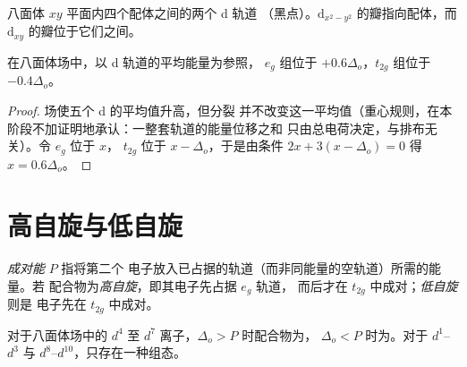 \begin{omfigure}

{\small 八面体 $xy$ 平面内四个配体之间的两个 d 轨道
（黑点）。$\mathrm d_{x^2-y^2}$ 的瓣指向配体，而
$\mathrm d_{xy}$ 的瓣位于它们之间。}
\end{omfigure}

\begin{theorem}[重心]\label{thm:b2:ligand-field:barycentre}
在八面体场中，以 d 轨道的平均能量为参照，
$e_g$ 组位于 $+0.6\Delta_o$，$t_{2g}$ 组位于 $-0.4\Delta_o$。
\end{theorem}

\begin{proof}
场使五个 d 的平均值升高，但分裂
并不改变这一平均值（重心规则，在本阶段不加证明地承认：一整套轨道的能量位移之和
只由总电荷决定，与排布无关）。令 $e_g$ 位于 $x$，
$t_{2g}$ 位于 $x - \Delta_o$，于是由条件 $2x + 3(x - \Delta_o) = 0$ 得 $x = 0.6\Delta_o$。
\end{proof}

\section{高自旋与低自旋}

\begin{definition}[自旋态]\label{def:b2:ligand-field:spin}
\emph{成对能} $P$ 指将第二个
电子放入已占据的轨道（而非同能量的空轨道）所需的能量。若
配合物为\emph{高自旋}，即其电子先占据 $e_g$ 轨道，
而后才在 $t_{2g}$ 中成对；\emph{低自旋}则是
电子先在 $t_{2g}$ 中成对。
\end{definition}

\begin{proposition}[自旋态的选择]\label{prop:b2:ligand-field:spin-state}
对于八面体场中的 $d^4$ 至 $d^7$ 离子，$\Delta_o > P$ 时配合物为，
$\Delta_o < P$ 时为。对于 $d^1$--$d^3$ 与 $d^8$--$d^{10}$，只存在一种组态。
\end{proposition}

